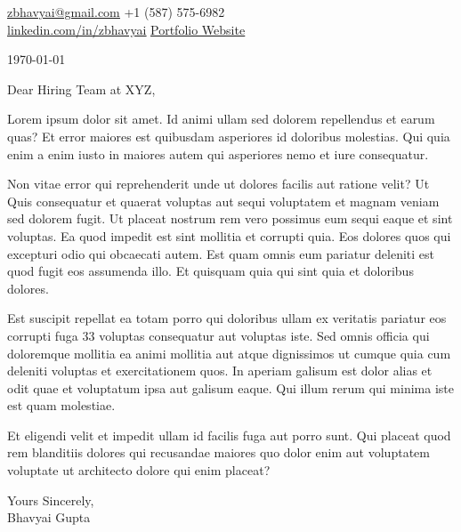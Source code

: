 \documentclass[letter]{article}
\newcommand{\body} [1] {
    \begin{justify}
        {\fontsize{11pt}{13pt}\selectfont #1}
    \end{justify}
    \vspace{1pt}
}
\begin{document}
{}
\vspace{5pt}

\href{mailto:zbhavyai@gmail.com}{\uline{zbhavyai@gmail.com}} \hfill {+1 (587) 575-6982}\\
\href{https://linkedin.com/in/zbhavyai}{\uline{linkedin.com/in/zbhavyai}} \hfill \href{https://zbhavyai.github.io}{\uline{Portfolio Website}}

\vspace{15pt}
\body {\today}
\vspace{15pt}
\body {Dear Hiring Team at XYZ,}

\body {
Lorem ipsum dolor sit amet. Id animi ullam sed dolorem repellendus et earum quas? Et error maiores est quibusdam asperiores id doloribus molestias. Qui quia enim a enim iusto in maiores autem qui asperiores nemo et iure consequatur.
}

\body {
Non vitae error qui reprehenderit unde ut dolores facilis aut ratione velit? Ut Quis consequatur et quaerat voluptas aut sequi voluptatem et magnam veniam sed dolorem fugit. Ut placeat nostrum rem vero possimus eum sequi eaque et sint voluptas. Ea quod impedit est sint mollitia et corrupti quia. Eos dolores quos qui excepturi odio qui obcaecati autem. Est quam omnis eum pariatur deleniti est quod fugit eos assumenda illo. Et quisquam quia qui sint quia et doloribus dolores.
}

\body {
Est suscipit repellat ea totam porro qui doloribus ullam ex veritatis pariatur eos corrupti fuga 33 voluptas consequatur aut voluptas iste. Sed omnis officia qui doloremque mollitia ea animi mollitia aut atque dignissimos ut cumque quia cum deleniti voluptas et exercitationem quos. In aperiam galisum est dolor alias et odit quae et voluptatum ipsa aut galisum eaque. Qui illum rerum qui minima iste est quam molestiae.
}

\body {
Et eligendi velit et impedit ullam id facilis fuga aut porro sunt. Qui placeat quod rem blanditiis dolores qui recusandae maiores quo dolor enim aut voluptatem voluptate ut architecto dolore qui enim placeat?
}

\vspace{15pt}
\body{
Yours Sincerely, \\
Bhavyai Gupta}

\end{document}

